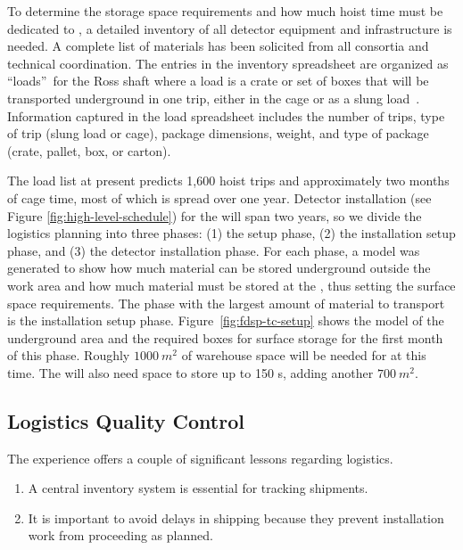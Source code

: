 To determine the %
storage space requirements and how much hoist time must be dedicated to , a detailed inventory of all   detector equipment and infrastructure is needed. 
A complete list of materials has been solicited from all consortia and technical coordination. 
The entries in the inventory spreadsheet are organized as \textquotedblleft loads\textquotedblright \ for the Ross shaft where a load is a crate or set of boxes that will be transported underground in one trip, either in the cage or as a slung load~\cite{bib:docdb8426}. 
Information captured in the load spreadsheet includes the number of  
trips, type of trip (slung load or cage), package dimensions, weight, and type of package (crate, pallet, box, or carton). 

The load list at present predicts 1,600 hoist trips and approximately two  months of cage time, most of which is spread over one year. 
Detector installation (see Figure \ref{fig:high-level-schedule}) for the  will span two years, so we divide the logistics planning into three phases: (1) the  setup phase, (2) the installation setup phase, and (3) the detector installation phase. 
For each phase, a \threed model was generated to show how much material can be stored underground outside the work area and how much material must be stored %
at the , thus setting the surface space requirements. 
The phase with the largest amount of material to transport is the installation setup phase.  
Figure~\ref{fig:fdsp-tc-setup} shows the model of the underground area and the required boxes for surface storage for %
the first month of this phase. %
Roughly $\SI{1000}{m^2}$ of warehouse space will be needed for  at this time.  The  will also need space to store up to 150 s, 
adding another $\SI{700}{m^2}$. %


\subsection{Logistics Quality Control}
\label{sec:fdsp-tc-log-qaqc}


 
The  experience offers a couple of significant lessons regarding logistics.

\begin{enumerate}
\item A central inventory system is essential for tracking  shipments.
\item It is important to avoid delays in shipping because they prevent installation work from  proceeding as planned. 
\end{enumerate}

